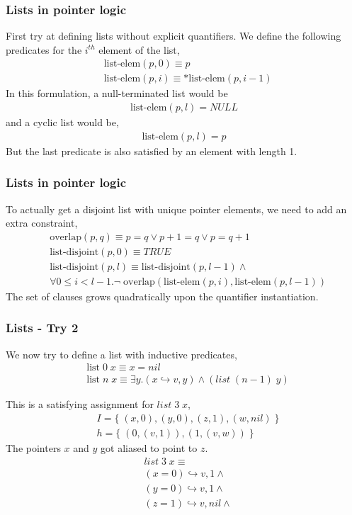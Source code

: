 \documentclass{beamer}
\begin{document}
\begin{frame}
\frametitle{Lists in pointer logic}
	First try at defining lists without explicit quantifiers. We define the following predicates for the $i^{th}$
element of the list,
\begin{align*}
	& \textrm{list-elem}(p,0) \equiv p \\
	& \textrm{list-elem}(p,i) \equiv *\textrm{list-elem}(p,i-1)
\end{align*}
In this formulation, a null-terminated list would be \\
\begin{align*} \textrm{list-elem}(p,l) = NULL
\end{align*}
and a cyclic list would be,
\begin{align*} \textrm{list-elem}(p,l) = p \end{align*}
But the last predicate is also satisfied by an element with length 1.
\end{frame}

\begin{frame}
\frametitle{Lists in pointer logic}
To actually get a disjoint list with unique pointer elements,
we need to add an extra constraint,
\begin{align*}
	& \textrm{overlap}(p,q) \equiv p = q \lor p + 1 = q \lor p = q + 1 \\
	& \textrm{list-disjoint}(p,0) \equiv TRUE \\
	& \textrm{list-disjoint}(p,l) \equiv
	\textrm{list-disjoint}(p,l-1) \land \\
	& \forall 0 \leq i < l - 1.
	\neg \; \textrm{overlap}(
	\textrm{list-elem}(p,i), \textrm{list-elem}(p,l-1))
\end{align*}
The set of clauses grows quadratically upon the quantifier instantiation.
\end{frame}

\begin{frame}
\frametitle{Lists - Try 2}
We now try to define a list with inductive predicates,
\begin{align*}
    & \textrm{list} \; 0 \; x \equiv x = nil
    \\
    & \textrm{list} \; n \; x \equiv \exists y. (x \hookrightarrow v,y) \land (list \; (n-1) \; y)
\end{align*}

This is a satisfying assignment for $list \; 3 \; x$,
\begin{align*}
    & I = 
    \{\; (x,0), (y,0), (z,1) , (w,nil) \;\}
    \\
    & h = 
    \{\; (0, (v,1)) , (1, (v,w)) \;\}
\end{align*}
The pointers $x$ and $y$ got aliased to point to $z$.
\begin{align*}
    & list \; 3 \; x \equiv \\
    & (x = 0) \hookrightarrow v,1 \land \\
    & (y = 0) \hookrightarrow v,1 \land \\
    & (z = 1) \hookrightarrow v,nil \land \\
\end{align*}
\end{frame}
\end{document}
